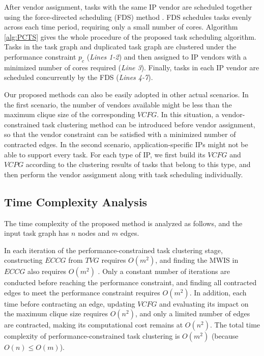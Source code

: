 \documentclass[10pt,journal, compsoc]{IEEEtran}
\begin{document}
After vendor assignment, tasks with the same IP vendor are scheduled together using the force-directed scheduling (FDS) method \cite{article:PP}. FDS schedules tasks evenly across each time period, requiring only a small number of cores. Algorithm \ref{alg:PCTS} gives the whole procedure of the proposed task scheduling algorithm. Tasks in the task graph and duplicated task graph are clustered under the performance constraint $p_c$ (\textit{Lines 1-2}) and then assigned to IP vendors with a minimized number of cores required (\textit{Line 3}). Finally, tasks in each IP vendor are scheduled concurrently by the FDS (\textit{Lines 4-7}).%

Our proposed methods can also be easily adopted in other actual scenarios. In the first scenario, the number of vendors available might be less than the maximum clique size of the corresponding $VCFG$. In this situation, a vendor-constrained task clustering method \cite{article:NW} can be introduced before vendor assignment, so that the vendor constraint can be satisfied with a minimized number of contracted edges. In the second scenario, application-specific IPs might not be able to support every task. For each type of IP, we first build its $VCFG$ and $VCPG$ according to the clustering results of tasks that belong to this type, and then perform the vendor assignment along with task scheduling individually.

\subsection{Time Complexity Analysis}

The time complexity of the proposed method is analyzed as follows, and the input task graph has $n$ nodes and $m$ edges.

In each iteration of the performance-constrained task clustering stage, constructing $ECCG$ from $TVG$ requires $O(m^2)$, and finding the MWIS in $ECCG$ also requires $O(m^2)$ \cite{conference:LC}. Only a constant number of iterations are conducted before reaching the performance constraint, and finding all contracted edges to meet the performance constraint requires $O(m^2)$. In addition, each time before contracting an edge, updating $VCFG$ and evaluating its impact on the maximum clique size requires $O(n^2)$, and only a limited number of edges are contracted, making its computational cost remains at $O(n^2)$. The total time complexity of performance-constrained task clustering is $O(m^2)$ (because $O(n)\leq O(m)$).
\end{document}
